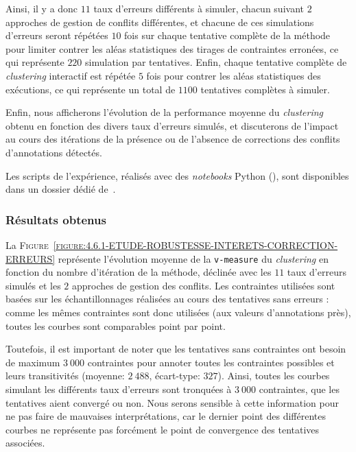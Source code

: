			Ainsi, il y a donc $11$ taux d'erreurs différents à simuler, chacun suivant $2$ approches de gestion de conflits différentes, et chacune de ces simulations d'erreurs seront répétées $10$ fois sur chaque tentative complète de la méthode pour limiter contrer les aléas statistiques des tirages de contraintes erronées, ce qui représente $220$ simulation par tentatives.
			Enfin, chaque tentative complète de \textit{clustering} interactif est répétée $5$ fois pour contrer les aléas statistiques des exécutions, ce qui représente un total de $1100$ tentatives complètes à simuler.

			Enfin, nous afficherons l'évolution de la performance moyenne du \textit{clustering} obtenu en fonction des divers taux d'erreurs simulés, et discuterons de l'impact au cours des itérations de la présence ou de l'absence de corrections des conflits d'annotations détectés.
			
			\begin{leftBarInformation}
				Les scripts de l'expérience, réalisés avec des \textit{notebooks} Python (\cite{van-rossum-drake:2009:python-reference-manual}), sont disponibles dans un dossier dédié de~\cite{schild:2021:cognitivefactory-interactiveclusteringcomparativestudy}.
			\end{leftBarInformation}

		\subsubsection{Résultats obtenus}
		
			La \textsc{Figure~\ref{figure:4.6.1-ETUDE-ROBUSTESSE-INTERETS-CORRECTION-ERREURS}} représente l'évolution moyenne de la \texttt{v-measure} du \textit{clustering} en fonction du nombre d'itération de la méthode, déclinée avec les $11$ taux d'erreurs simulés et les $2$ approches de gestion des conflits.
			Les contraintes utilisées sont basées sur les échantillonnages réalisées au cours des tentatives sans erreurs : comme les mêmes contraintes sont donc utilisées (aux valeurs d'annotations près), toutes les courbes sont comparables point par point.
			
			\begin{leftBarWarning}
				Toutefois, il est important de noter que les tentatives sans contraintes ont besoin de maximum $3~000$ contraintes pour annoter toutes les contraintes possibles et leurs transitivités (moyenne: $2~488$, écart-type: $327$).
				Ainsi, toutes les courbes simulant les différents taux d'erreurs sont tronquées à $3~000$ contraintes, que les tentatives aient convergé ou non.
				Nous serons sensible à cette information pour ne pas faire de mauvaises interprétations, car le dernier point des différentes courbes ne représente pas forcément le point de convergence des tentatives associées.
			\end{leftBarWarning}
			
